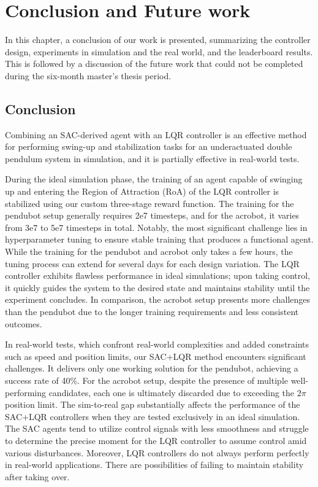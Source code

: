 \chapter{Conclusion and Future work}
In this chapter, a conclusion of our work is presented, summarizing the controller design, experiments in simulation and the real world, and the leaderboard results. This is followed by a discussion of the future work that could not be completed during the six-month master's thesis period.

\section{Conclusion}
Combining an SAC-derived agent with an LQR controller is an effective method for performing swing-up and stabilization tasks for an underactuated double pendulum system in simulation, and it is partially effective in real-world tests.

During the ideal simulation phase, the training of an agent capable of swinging up and entering the Region of Attraction (RoA) of the LQR controller is stabilized using our custom three-stage reward function. The training for the pendubot setup generally requires 2e7 timesteps, and for the acrobot, it varies from 3e7 to 5e7 timesteps in total. Notably, the most significant challenge lies in hyperparameter tuning to ensure stable training that produces a functional agent. While the training for the pendubot and acrobot only takes a few hours, the tuning process can extend for several days for each design variation. The LQR controller exhibits flawless performance in ideal simulations; upon taking control, it quickly guides the system to the desired state and maintains stability until the experiment concludes. In comparison, the acrobot setup presents more challenges than the pendubot due to the longer training requirements and less consistent outcomes.

In real-world tests, which confront real-world complexities and added constraints such as speed and position limits, our SAC+LQR method encounters significant challenges. It delivers only one working solution for the pendubot, achieving a success rate of 40\%. For the acrobot setup, despite the presence of multiple well-performing candidates, each one is ultimately discarded due to exceeding the \(2\pi\) position limit. The sim-to-real gap substantially affects the performance of the SAC+LQR controllers when they are tested exclusively in an ideal simulation. The SAC agents tend to utilize control signals with less smoothness and struggle to determine the precise moment for the LQR controller to assume control amid various disturbances. Moreover, LQR controllers do not always perform perfectly in real-world applications. There are possibilities of failing to maintain stability after taking over.

